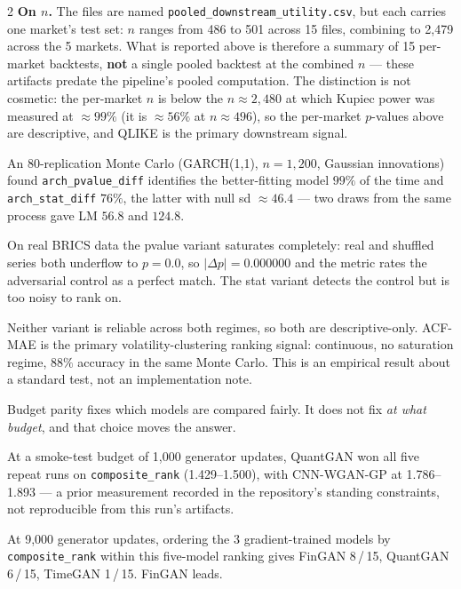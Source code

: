 \documentclass[10pt]{article}
\newcommand{\amberbox}[2]{\begin{tcolorbox}[mybox={Amber}{ABg},title={#1}]#2\end{tcolorbox}}
\newcommand{\redbox}[2]{\begin{tcolorbox}[mybox={DRed}{RBg},title={#1}]#2\end{tcolorbox}}
\begin{document}
\begin{multicols}{2}
{\smallskip
\textbf{On $n$.} The files are named \texttt{pooled\_downstream\_utility.csv}, but each carries one market's test set: $n$ ranges from 486 to 501 across 15 files, combining to 2,479 across the 5 markets. What is reported above is therefore a summary of 15 per-market backtests, \textbf{not} a single pooled backtest at the combined $n$ --- these artifacts predate the pipeline's pooled computation. The distinction is not cosmetic: the per-market $n$ is below the $n\approx2{,}480$ at which Kupiec power was measured at $\approx99\%$ (it is $\approx56\%$ at $n\approx496$), so the per-market $p$-values above are descriptive, and QLIKE is the primary downstream signal.}

\columnbreak

\amberbox{ARCH-LM: A Regime Failure, Reported as a Result}{%
An 80-replication Monte Carlo (GARCH(1,1), $n=1{,}200$, Gaussian innovations) found \texttt{arch\_pvalue\_diff} identifies the better-fitting model $99\%$ of the time and \texttt{arch\_stat\_diff} $76\%$, the latter with null sd $\approx46.4$ --- two draws from the same process gave LM $56.8$ and $124.8$.

\smallskip
On real BRICS data the pvalue variant saturates completely: real and shuffled series both underflow to $p=0.0$, so $|\Delta p| = 0.000000$ and the metric rates the adversarial control as a perfect match. The stat variant detects the control but is too noisy to rank on.

\smallskip
Neither variant is reliable across both regimes, so both are descriptive-only. ACF-MAE is the primary volatility-clustering ranking signal: continuous, no saturation regime, $88\%$ accuracy in the same Monte Carlo. This is an empirical result about a standard test, not an implementation note.}

\redbox{What the Budget Choice Cost}{%
Budget parity fixes which models are compared fairly. It does not fix \emph{at what budget}, and that choice moves the answer.

\smallskip
At a smoke-test budget of 1{,}000 generator updates, QuantGAN won all five repeat runs on \texttt{composite\_rank} (1.429--1.500), with CNN-WGAN-GP at 1.786--1.893 --- a prior measurement recorded in the repository's standing constraints, not reproducible from this run's artifacts.

\smallskip
At 9,000 generator updates, ordering the 3 gradient-trained models by \texttt{composite\_rank} within this five-model ranking gives FinGAN 8\,/\,15, QuantGAN 6\,/\,15, TimeGAN 1\,/\,15. FinGAN leads.

}
\end{multicols}
\end{document}
